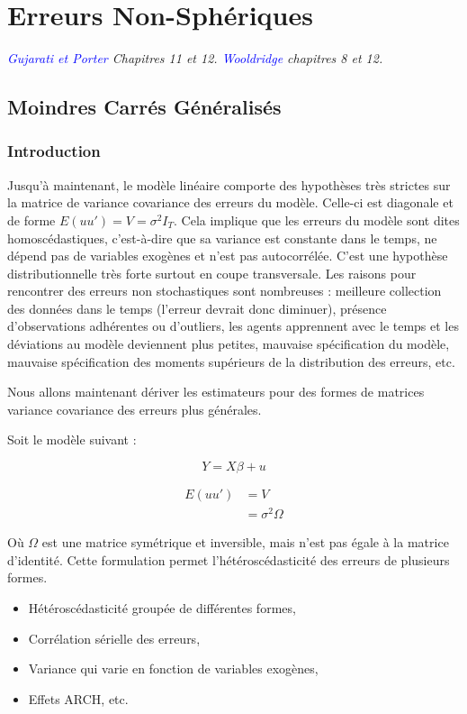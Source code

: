 \documentclass[14pt]{extarticle} %
\theoremstyle{definition}
\theoremstyle{plain}
\newcommand{\livre}[1]{\textcolor{blue}{#1}}
\begin{document}
\section{Erreurs Non-Sphériques}

\textit{\livre{Gujarati et Porter} Chapitres 11 et 12. \livre{Wooldridge} chapitres 8 et 12.}

\subsection{Moindres Carrés Généralisés}

\subsubsection{Introduction}

Jusqu’à maintenant, le modèle linéaire comporte des hypothèses très strictes sur la matrice de variance covariance des erreurs du modèle. Celle-ci est diagonale et de forme $E(uu') = V = \sigma^2 I_T$. Cela implique que les erreurs du modèle sont dites homoscédastiques, c’est-à-dire que sa variance est constante dans le temps, ne dépend pas de variables exogènes et n’est pas autocorrélée. C’est une hypothèse distributionnelle très forte surtout en coupe transversale. Les raisons pour rencontrer des erreurs non stochastiques sont nombreuses : meilleure collection des données dans le temps (l’erreur devrait donc diminuer), présence d’observations adhérentes ou d’outliers, les agents apprennent avec le temps et les déviations au modèle deviennent plus petites, mauvaise spécification du modèle, mauvaise spécification des moments supérieurs de la distribution des erreurs, etc.

Nous allons maintenant dériver les estimateurs pour des formes de matrices variance covariance des erreurs plus générales.

Soit le modèle suivant :

\[
Y = X\beta + u
\]

\begin{align*}
E(uu') &= V \\
&= \sigma^2 \Omega
\end{align*}

Où $\Omega$ est une matrice symétrique et inversible, mais n’est pas égale à la matrice d’identité. Cette formulation permet l’hétéroscédasticité des erreurs de plusieurs formes.
\begin{itemize}
    \item Hétéroscédasticité groupée de différentes formes,
    \item Corrélation sérielle des erreurs,
    \item Variance qui varie en fonction de variables exogènes,
    \item Effets ARCH, etc.
\end{itemize}
\end{document}
